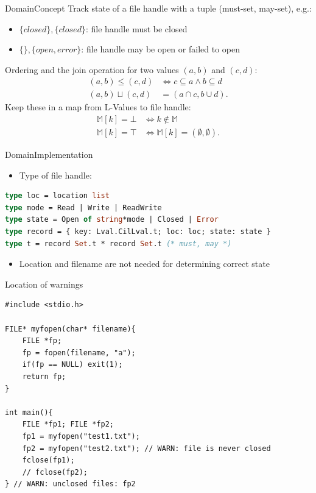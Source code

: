 \documentclass{beamer}
\begin{document}
\begin{frame}[fragile]{Domain}{Concept}
Track state of a file handle with a tuple (must-set, may-set), e.g.:
\begin{itemize}
\item $\{closed\}, \{closed\}$: file handle must be closed
\item $\{\}, \{open, error\}$: file handle may be open or failed to open
\end{itemize} \pause
Ordering and the join operation for two values $(a,b)$ and $(c,d)$:
\begin{align}
(a,b) \leq (c,d) &\Leftrightarrow c \subseteq a \wedge b \subseteq d\\
(a,b) \sqcup (c,d) &= (a \cap c, b \cup d).
\end{align} \pause
Keep these in a map from L-Values to file handle:
\begin{align}
\mathbb{M}[k] = \bot &\Leftrightarrow k \notin \mathbb{M}\\
\mathbb{M}[k] = \top &\Leftrightarrow \mathbb{M}[k] = (\emptyset, \emptyset).
\end{align}
\end{frame}

\begin{frame}[fragile]{Domain}{Implementation}
\begin{itemize}
\item Type of file handle:
\end{itemize}
\begin{lstlisting}[language=ML]
type loc = location list
type mode = Read | Write | ReadWrite
type state = Open of string*mode | Closed | Error
type record = { key: Lval.CilLval.t; loc: loc; state: state }
type t = record Set.t * record Set.t (* must, may *)
\end{lstlisting}
\begin{itemize}
\item Location and filename are not needed for determining correct state
\end{itemize}
\end{frame}

\begin{frame}[fragile]{Location of warnings}
\begin{lstlisting}
#include <stdio.h>

FILE* myfopen(char* filename){
    FILE *fp;
    fp = fopen(filename, "a");
    if(fp == NULL) exit(1);
    return fp;
}

int main(){
    FILE *fp1; FILE *fp2;
    fp1 = myfopen("test1.txt");
    fp2 = myfopen("test2.txt"); // WARN: file is never closed
    fclose(fp1);
    // fclose(fp2);
} // WARN: unclosed files: fp2
\end{lstlisting}
\end{frame}
\end{document}

